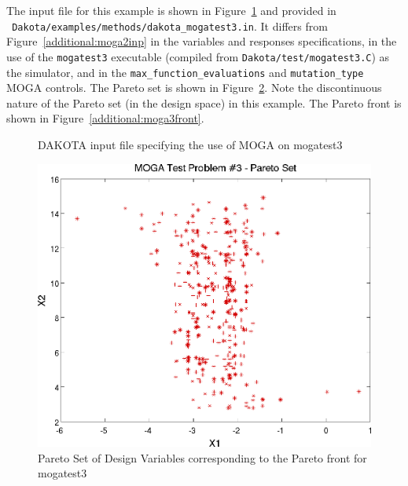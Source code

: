 The input file for this example is shown in
Figure~\ref{additional:moga3inp} and provided in \\ {\tt
Dakota/examples/methods/dakota\_mogatest3.in}.  It differs from
Figure~\ref{additional:moga2inp} in the variables and responses
specifications, in the use of the \texttt{mogatest3} executable
(compiled from \texttt{Dakota/test/mogatest3.C}) as the simulator, and
in the \texttt{max\_function\_evaluations} and \texttt{mutation\_type}
MOGA controls.  The Pareto set is shown in
Figure~\ref{additional:moga3set}.  Note the discontinuous nature of the
Pareto set (in the design space) in this example.  The Pareto front is
shown in Figure~\ref{additional:moga3front}.

\begin{figure}
  \centering
  \begin{bigbox}
    \begin{small}
    \end{small}
  \end{bigbox}
  \caption{DAKOTA input file specifying the use of MOGA on mogatest3}
  \label{additional:moga3inp}
\end{figure}

\begin{figure}
  \centering
  \includegraphics[scale=0.75]{images/dakota_mogatest3_pareto_set}
  \caption{Pareto Set of Design Variables corresponding to the Pareto
    front for mogatest3}
  \label{additional:moga3set}
\end{figure}

